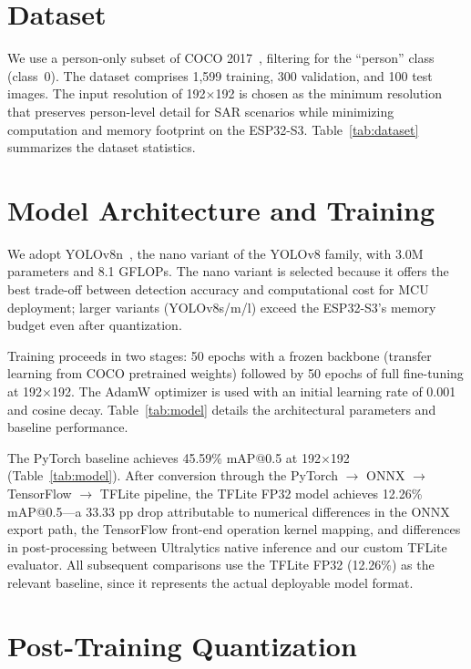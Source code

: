 \documentclass[10pt,twocolumn]{article}
\begin{document}
\section{Dataset}
\label{sec:dataset}

We use a person-only subset of COCO 2017~\cite{coco}, filtering for the ``person'' class (class~0). The dataset comprises 1,599 training, 300 validation, and 100 test images. The input resolution of 192$\times$192 is chosen as the minimum resolution that preserves person-level detail for SAR scenarios while minimizing computation and memory footprint on the ESP32-S3. Table~\ref{tab:dataset} summarizes the dataset statistics.



\section{Model Architecture and Training}
\label{sec:model}

We adopt YOLOv8n~\cite{ultralytics}, the nano variant of the YOLOv8 family, with 3.0M parameters and 8.1 GFLOPs. The nano variant is selected because it offers the best trade-off between detection accuracy and computational cost for MCU deployment; larger variants (YOLOv8s/m/l) exceed the ESP32-S3's memory budget even after quantization.

Training proceeds in two stages: 50 epochs with a frozen backbone (transfer learning from COCO pretrained weights) followed by 50 epochs of full fine-tuning at 192$\times$192. The AdamW optimizer is used with an initial learning rate of 0.001 and cosine decay. Table~\ref{tab:model} details the architectural parameters and baseline performance.

The PyTorch baseline achieves 45.59\% mAP@0.5 at 192$\times$192 (Table~\ref{tab:model}). After conversion through the PyTorch $\rightarrow$ ONNX $\rightarrow$ TensorFlow $\rightarrow$ TFLite pipeline, the TFLite FP32 model achieves 12.26\% mAP@0.5---a 33.33 pp drop attributable to numerical differences in the ONNX export path, the TensorFlow front-end operation kernel mapping, and differences in post-processing between Ultralytics native inference and our custom TFLite evaluator. All subsequent comparisons use the TFLite FP32 (12.26\%) as the relevant baseline, since it represents the actual deployable model format.



\section{Post-Training Quantization}
\label{sec:quantization}
\end{document}
